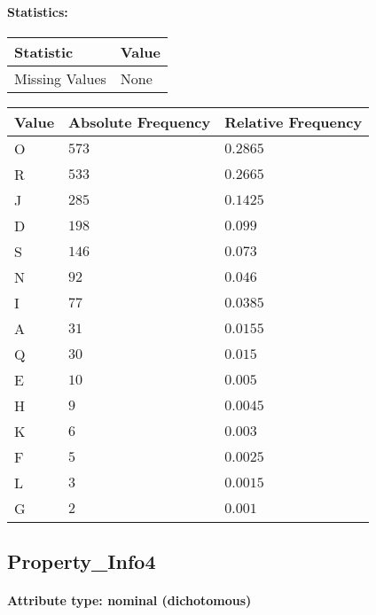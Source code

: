 \paragraph{Statistics: }
\begin{table}[H]
	\renewcommand{\arraystretch}{1.25}
	\begin{tabular}{l|l}
		\textbf{Statistic} & \textbf{Value}\\\hline
		Missing Values& None\\\hline
	\end{tabular}
\end{table}
\begin{table}[H]
	\renewcommand{\arraystretch}{1.25}
	\begin{tabular}{l|l|l}
		\textbf{Value} & \textbf{Absolute Frequency} & \textbf{Relative Frequency}\\\hline
		O&$573$&$0.2865$\\\hline
		R&$533$&$0.2665$\\\hline
		J&$285$&$0.1425$\\\hline
		D&$198$&$0.099$\\\hline
		S&$146$&$0.073$\\\hline
		N&$92$&$0.046$\\\hline
		I&$77$&$0.0385$\\\hline
		A&$31$&$0.0155$\\\hline
		Q&$30$&$0.015$\\\hline
		E&$10$&$0.005$\\\hline
		H&$9$&$0.0045$\\\hline
		K&$6$&$0.003$\\\hline
		F&$5$&$0.0025$\\\hline
		L&$3$&$0.0015$\\\hline
		G&$2$&$0.001$
	\end{tabular}
\end{table}

\subsection{Property\_Info4}
\paragraph{Attribute type: nominal (dichotomous)}
